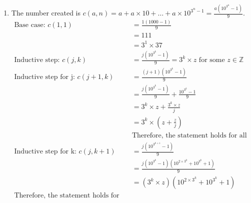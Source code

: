 \documentclass{article}
\begin{document}
\begin{enumerate}[label=\alph*.]
    \item The number created is $c(a, n) = a + a \times 10 + \dots + a \times 10^{3^n-1} = \frac{a(10^{3^n} - 1)}{9}$. \[\begin{aligned}
                  \text{Base case: } c(1,1)               & = \frac{1(1000 - 1)}{9}                                                       \\
                                                          & = 111                                                                         \\
                                                          & = 3^1 \times 37                                                               \\
                  \text{Inductive step: } c(j, k)         & = \frac{j(10^{3^k} - 1)}{9} = 3^k \times z \text{ for some } z \in \mathbb{Z} \\
                  \text{Inductive step for j: } c(j+1, k) & = \frac{(j+1)(10^{3^k} - 1)}{9}                                               \\
                                                          & = \frac{j(10^{3^k} - 1)}{9} + \frac{10^{3^k} - 1}{9}                          \\
                                                          & = 3^k \times z + \frac{3^k \times z}{j}                                       \\
                                                          & = 3^k \times (z + \frac{z}{j})                                                \\
                                                          & \text{Therefore, the statement holds for all j}                               \\
                  \text{Inductive step for k: } c(j, k+1) & = \frac{j(10^{3^{k+1}} - 1)}{9}                                               \\
                                                          & = \frac{j(10^{3^k} - 1)(10^{2 \times 3^k} + 10^{3^k} + 1)}{9}                 \\
                                                          & = (3^k \times z)(10^{2 \times 3^k} + 10^{3^k} + 1)                            \\
                  \text{Therefore, the statement holds for all k}                                                                         \\

\end{aligned}\]
\end{enumerate}
\end{document}
